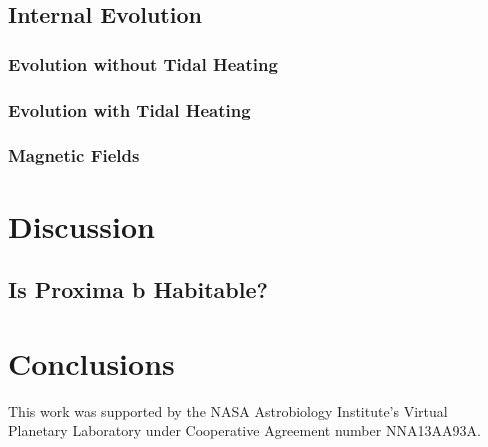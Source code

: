 \documentclass[preprint,12pt]{aastex}
\begin{document}


\subsection{Internal Evolution}

\subsubsection{Evolution without Tidal Heating}


\subsubsection{Evolution with Tidal Heating}



\subsubsection{Magnetic Fields}


\section{Discussion\label{sec:disc}}

\subsection{Is Proxima b Habitable?}



\section{Conclusions\label{sec:concl}}

\vspace{1cm}
This work was supported by the NASA Astrobiology Institute's Virtual
Planetary Laboratory under Cooperative Agreement number NNA13AA93A.



\end{document}
